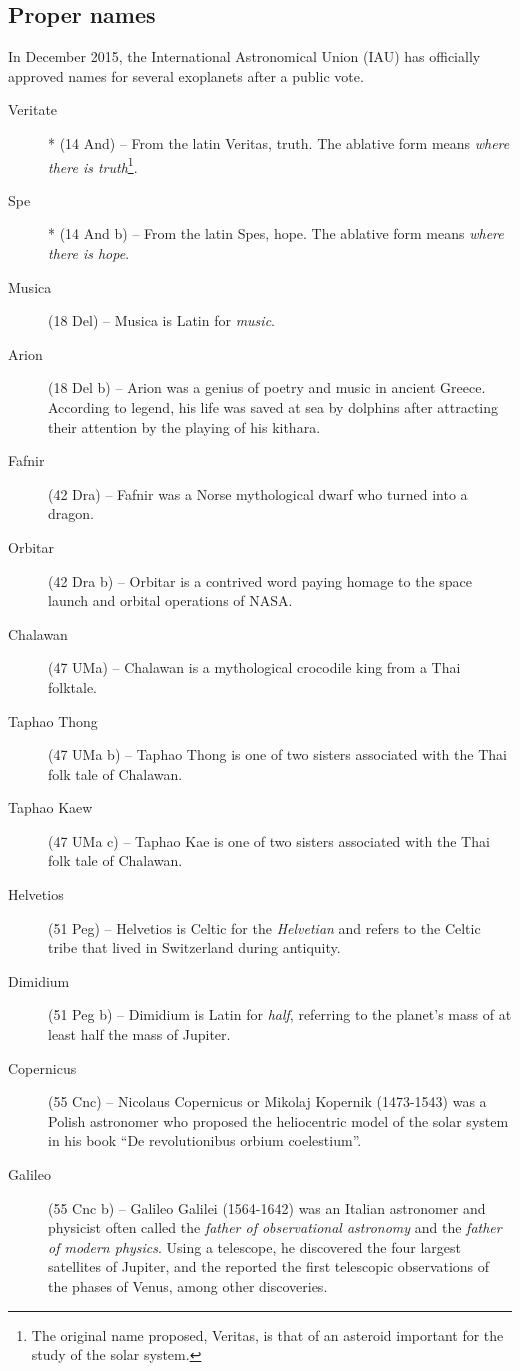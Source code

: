 \subsection{Proper names}
\label{sec:plugins:Exoplanets:ProperNames}
In December 2015, the International Astronomical Union (IAU) has officially approved names for several exoplanets after a public vote.
\begin{description}
\item[Veritate]* (14 And) -- From the latin Veritas, truth. The ablative form means \textit{where there is truth}\footnote{The original name proposed, Veritas, is that of an asteroid important for the study of the solar system.}.
\item[Spe]* (14 And b) -- From the latin Spes, hope. The ablative form means \textit{where there is hope}.
\item[Musica] (18 Del) -- Musica is Latin for \textit{music}.
\item[Arion] (18 Del b) -- Arion was a genius of poetry and music in ancient Greece. According to legend, his life was saved at sea by dolphins after attracting their attention by the playing of his kithara.
\item[Fafnir] (42 Dra) -- Fafnir was a Norse mythological dwarf who turned into a dragon.
\item[Orbitar] (42 Dra b) -- Orbitar is a contrived word paying homage to the space launch and orbital operations of NASA.
\item[Chalawan] (47 UMa) -- Chalawan is a mythological crocodile king from a Thai folktale.
\item[Taphao Thong] (47 UMa b) -- Taphao Thong is one of two sisters associated with the Thai folk tale of Chalawan.
\item[Taphao Kaew] (47 UMa c) -- Taphao Kae is one of two sisters associated with the Thai folk tale of Chalawan.
\item[Helvetios] (51 Peg) -- Helvetios is Celtic for the \textit{Helvetian} and refers to the Celtic tribe that lived in Switzerland during antiquity.
\item[Dimidium] (51 Peg b) -- Dimidium is Latin for \textit{half}, referring to the planet's mass of at least half the mass of Jupiter.
\item[Copernicus] (55 Cnc) -- Nicolaus Copernicus or Mikolaj Kopernik (1473-1543) was a Polish astronomer who proposed the heliocentric model of the solar system in his book ``De revolutionibus orbium coelestium''.
\item[Galileo] (55 Cnc b) -- Galileo Galilei (1564-1642) was an Italian astronomer and physicist often called the \textit{father of observational astronomy} and the \textit{father of modern physics}. Using a telescope, he discovered the four largest satellites of Jupiter, and the reported the first telescopic observations of the phases of Venus, among other discoveries.

\end{description}
